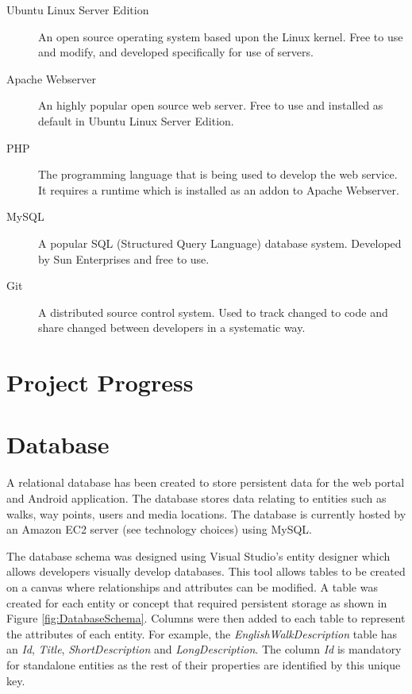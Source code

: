 \documentclass[11pt,a4paper]{article}
\begin{document}
\begin{description}
\item[Ubuntu Linux Server Edition] An open source operating system based upon the Linux kernel. Free to use and modify, and developed specifically for use of servers. 

\item[Apache Webserver] An highly popular open source web server. Free to use and installed as default in Ubuntu Linux Server Edition.

\item[PHP] The programming language that is being used to develop the web service. It requires a runtime which is installed as an addon to Apache Webserver. 

\item[MySQL] A popular SQL (Structured Query Language) database system. Developed by Sun Enterprises and free to use. 

\item[Git] A distributed source control system. Used to track changed to code and share changed between developers in a systematic way. 
\end{description}


\section{Project Progress}

\section{Database}

A relational database has been created to store persistent data for the web portal and Android application.
The database stores data relating to entities such as walks, way points, users and media locations.
The database is currently hosted by an Amazon EC2 server (see technology choices) using MySQL.

The database schema was designed using Visual Studio's entity designer which allows developers visually develop databases.
This tool allows tables to be created on a canvas where relationships and attributes can be modified.
A table was created for each entity or concept that required persistent storage as shown in Figure \ref{fig:DatabaseSchema}.
Columns were then added to each table to represent the attributes of each entity.
For example, the \emph{EnglishWalkDescription} table has an \emph{Id}, \emph{Title}, \emph{ShortDescription} and \emph{LongDescription}. The column \emph{Id} is mandatory for standalone entities as the rest of their properties are identified by this unique key. 
\end{document}
